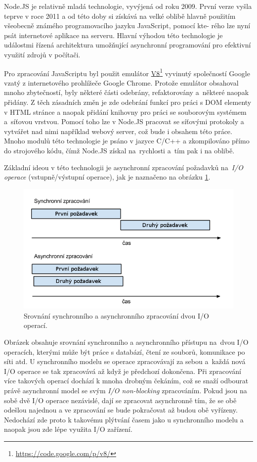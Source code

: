 \documentclass[thesis=M,czech]{FITthesis}[2012/06/26]
\newcommand\fnurl[2]{\href{#2}{#1}\footnote{\url{#2}}}
\begin{document}
	Node.JS je relativně mladá technologie, vyvýjená od roku 2009. První verze vyšla teprve v roce 2011 a od této doby si získává na velké oblibě hlavně použitím všeobecně známého programovacího jazyku JavaScript, pomocí kte- rého lze nyní psát internetové aplikace na serveru. Hlavní výhodou této technologie je událostmi řízená architektura umožňující asynchronní programování pro efektivní využití zdrojů v počítači.
	
	Pro zpracování JavaScriptu byl použit emulátor \fnurl{V8}{https://code.google.com/p/v8/} vyvinutý společností Google vzatý z internetového prohlížeče Google Chrome. Protože emulátor obsahoval mnoho zbytečností, byly některé části odebrány, refaktorovány a~některé naopak přidány. Z těch zásadních změn je zde odebrání funkcí pro práci s DOM elementy v HTML stránce a naopak přidání knihovny pro práci se souborovým systémem a~síťovou vrstvou. Pomocí toho lze v Node.JS pracovat se síťovými protokoly a vytvářet nad nimi například webový server, což bude i obsahem této práce. Mnoho modulů této technologie je psáno v jazyce C/C++ a zkompilováno přímo do strojového kódu, čímž Node.JS získal na~rychlosti a~tím pak i na oblibě.
	
	Základní ideou v této technologii je asynchronní zpracování požadavků na~\textit{I/O operace} (vstupně/výstupní operace), jak je naznačeno na obrázku \ref{fig:async_vs_sync}.

\begin{figure}[h]
	\includegraphics[width=1\textwidth]{images/node_sync_vs_async}
 	\caption[Srovnání asynchronního a synchronního zpracování]{Srovnání synchronního a asynchronního zpracování dvou I/O operací.}
 	\label{fig:async_vs_sync} 	
\end{figure}

	Obrázek obsahuje srovnání synchronního a asynchronního přístupu na~dvou I/O operacích, kterými může být práce s databází, čtení ze souborů, komunikace po síti atd. U synchronního modelu se operace zpracovávají za sebou a~každá nová I/O operace se tak zpracovává až když je předchozí dokončena. Při zpracování více takových operací dochází k mnoha drobným čekáním, což se snaží odbourat právě asynchronní model se svým \textit{I/O non-blocking} zpracováním. Pokud jsou na sobě dvě I/O operace nezávislé, dají se zpracovat asynchronně tím, že se obě odešlou najednou a ve zpracování se bude pokračovat až budou obě vyřízeny. Nedochází zde proto k takovému plýtvání časem jako u synchronního modelu a naopak jsou zde lépe využita I/O zařízení. 
	
\end{document}
